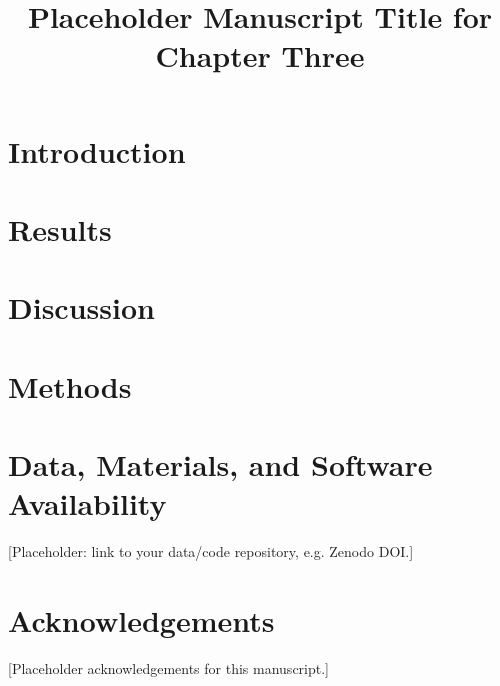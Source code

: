 \documentclass[../main.tex]{subfiles}
\title{Placeholder Manuscript Title for Chapter Three}
\affil{a}{Your Institute, Your Department, Your University, City, Country}
\begin{document}
\manuscriptfront

\section{Introduction}

\section{Results}

\section{Discussion}

\section{Methods}


\section*{Data, Materials, and Software Availability}
[Placeholder: link to your data/code repository, e.g. Zenodo DOI.]

\section*{Acknowledgements}
[Placeholder acknowledgements for this manuscript.]
\end{document}
